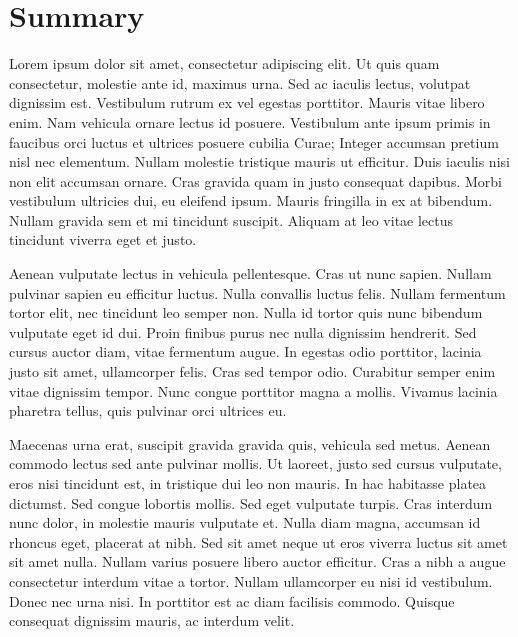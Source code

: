 \documentclass{jimouris-review}
\begin{document}
\maketitle

\section{Summary}
Lorem ipsum dolor sit amet, consectetur adipiscing elit. Ut quis quam consectetur, molestie ante id, maximus urna. Sed ac iaculis lectus, volutpat dignissim est. Vestibulum rutrum ex vel egestas porttitor. Mauris vitae libero enim. Nam vehicula ornare lectus id posuere. Vestibulum ante ipsum primis in faucibus orci luctus et ultrices posuere cubilia Curae; Integer accumsan pretium nisl nec elementum. Nullam molestie tristique mauris ut efficitur. Duis iaculis nisi non elit accumsan ornare. Cras gravida quam in justo consequat dapibus. Morbi vestibulum ultricies dui, eu eleifend ipsum. Mauris fringilla in ex at bibendum. Nullam gravida sem et mi tincidunt suscipit. Aliquam at leo vitae lectus tincidunt viverra eget et justo.

Aenean vulputate lectus in vehicula pellentesque. Cras ut nunc sapien. Nullam pulvinar sapien eu efficitur luctus. Nulla convallis luctus felis. Nullam fermentum tortor elit, nec tincidunt leo semper non. Nulla id tortor quis nunc bibendum vulputate eget id dui. Proin finibus purus nec nulla dignissim hendrerit. Sed cursus auctor diam, vitae fermentum augue. In egestas odio porttitor, lacinia justo sit amet, ullamcorper felis. Cras sed tempor odio. Curabitur semper enim vitae dignissim tempor. Nunc congue porttitor magna a mollis. Vivamus lacinia pharetra tellus, quis pulvinar orci ultrices eu.

Maecenas urna erat, suscipit gravida gravida quis, vehicula sed metus. Aenean commodo lectus sed ante pulvinar mollis. Ut laoreet, justo sed cursus vulputate, eros nisi tincidunt est, in tristique dui leo non mauris. In hac habitasse platea dictumst. Sed congue lobortis mollis. Sed eget vulputate turpis. Cras interdum nunc dolor, in molestie mauris vulputate et. Nulla diam magna, accumsan id rhoncus eget, placerat at nibh. Sed sit amet neque ut eros viverra luctus sit amet sit amet nulla. Nullam varius posuere libero auctor efficitur. Cras a nibh a augue consectetur interdum vitae a tortor. Nullam ullamcorper eu nisi id vestibulum. Donec nec urna nisi. In porttitor est ac diam facilisis commodo. Quisque consequat dignissim mauris, ac interdum velit.
\end{document}
